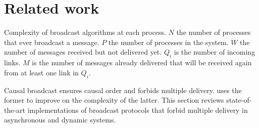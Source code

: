 
\section{Related work}
\label{sec:relatedwork}

\begin{table*}
  \begin{center}
    \caption{\label{table:complexity} Complexity of broadcast algorithms at each
      process. $N$ the number of processes that ever broadcast a message. $P$
      the number of processes in the system. $W$ the number of messages received
      but not delivered yet. $Q_i$ is the number of incoming links. $M$ is the
      number of messages already delivered that will be received again from at
      least one link in $Q_i$.}
  
  \end{center}
\end{table*}

Causal broadcast ensures causal order and forbids multiple
delivery. \RPCBROADCAST uses the former to improve on the complexity of the
latter.  This section reviews state-of-the-art implementations of broadcast
protocols that forbid multiple delivery in asynchronous and dynamic systems.




